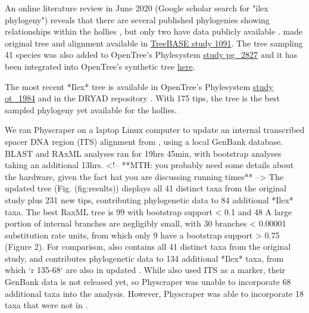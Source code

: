 \documentclass{bmcart}
\begin{document}
An online literature review in June 2020 (Google scholar search for "ilex phylogeny")
reveals that there are several published phylogenies showing relationships within
the hollies \cite{cuenoud2000molecular, manen2010history, setoguchi2000intersectional,
selbach2009new}, but only two have data publicly available \cite{gottlieb2005molecular, yao2020phylogeny}.
\cite{gottlieb2005molecular} made original tree and alignment available in
\href{https://treebase.org/treebase-web/search/study/summary.html?id=1091}{TreeBASE study 1091}.
The tree sampling 41 species was also added to
OpenTree's Phylesystem \href{https://tree.opentreeoflife.org/curator/study/edit/pg_2827/?tab=home}{study pg\_2827}
and it has been integrated into OpenTree's synthetic tree
\href{https://devtree.opentreeoflife.org/opentree/opentree12.3@mrcaott68451ott89474/Ilex-theizans--Ilex-dumosa}{here}.

The most recent *Ilex* tree \cite{yao2020phylogeny} is available in
OpenTree's Phylesystem \href{https://tree.opentreeoflife.org/curator/study/view/ot_1984}{study ot\_1984}
and in the DRYAD repository \cite{yao2020dryad}.
With 175 tips, the \cite{yao2020phylogeny} tree is the best sampled phylogeny yet available for
the hollies.

We ran Physcraper on a laptop Linux computer to update an internal transcribed
spacer DNA region (ITS) alignment from \cite{gottlieb2005molecular}, using a local
GenBank database.  BLAST and RAxML analyses ran for 19hrs 45min, with bootstrap
analyses taking an additional 13hrs.
<!-- **MTH: you probably need some details about the hardware, given the fact
hat you are discussing running times** -->
The updated \cite{gottlieb2005molecular} tree (Fig. \@ref(fig:results)) displays
all 41 distinct
taxa from the original study plus 231 new tips, contributing phylogenetic data to
84 additional *Ilex* taxa. The best RaxML tree is 99%
with bootstrap support < 0.1 and 48%
A large portion of internal branches are negligibly small, with 30 branches
< 0.00001 substitution rate units, from which only 9 have a bootstrap support > 0.75
(Figure 2).
For comparison, \cite{yao2020phylogeny} also contains all 41 distinct taxa from
the original
\cite{gottlieb2005molecular} study,
and contributes phylogenetic data to 134 additional *Ilex* taxa, from which
`r 135-68` are also in updated \cite{gottlieb2005molecular}. While \cite{yao2020phylogeny} also used
ITS as a marker, their GenBank data is not released yet, so Physcraper was unable
to incorporate 68 additional taxa into the analysis. However, Physcraper was able
to incorporate 18 taxa that were not in \cite{yao2020phylogeny}.
\end{document}
